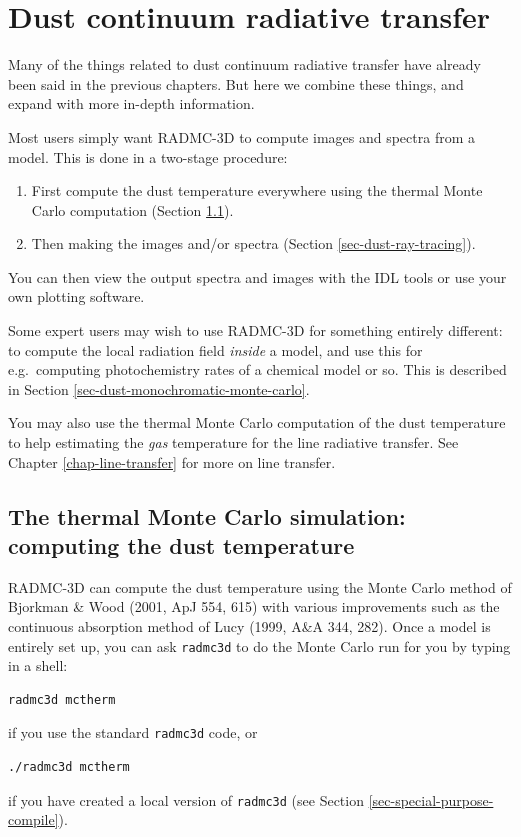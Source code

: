 \documentclass{report}
\begin{document}
\chapter{Dust continuum radiative transfer}
\label{chap-dust-transfer}
%
Many of the things related to dust continuum radiative transfer have
already been said in the previous chapters. But here we combine these
things, and expand with more in-depth information.

Most users simply want RADMC-3D to compute images and spectra from a
model. This is done in a two-stage procedure:
\begin{enumerate}
\item First compute the dust temperature everywhere using the thermal Monte
  Carlo computation (Section \ref{sec-dust-thermal-monte-carlo}).
\item Then making the images and/or spectra (Section \ref{sec-dust-ray-tracing}).
\end{enumerate}
You can then view the output spectra and images with the IDL tools or use
your own plotting software. 

Some expert users may wish to use RADMC-3D for something entirely different:
to compute the local radiation field {\em inside} a model, and use this
for e.g.\ computing photochemistry rates of a chemical model or so. 
This is described in Section \ref{sec-dust-monochromatic-monte-carlo}.

You may also use the thermal Monte Carlo computation of the dust temperature
to help estimating the {\em gas} temperature for the line radiative transfer.
See Chapter \ref{chap-line-transfer} for more on line transfer.



\section{The thermal Monte Carlo simulation: computing the dust temperature}
\label{sec-dust-thermal-monte-carlo}
%
RADMC-3D can compute the dust temperature using the Monte Carlo method of
Bjorkman \& Wood (2001, ApJ 554, 615) with various improvements such as the
continuous absorption method of Lucy (1999, A\&A 344, 282). Once a model is
entirely set up, you can ask {\small\tt radmc3d} to do the Monte Carlo
run for you by typing in a shell:
{\small\begin{verbatim}
radmc3d mctherm
\end{verbatim}}
if you use the standard {\small\tt radmc3d} code, or
{\small\begin{verbatim}
./radmc3d mctherm
\end{verbatim}}
if you have created a local version of {\small\tt radmc3d} 
(see Section \ref{sec-special-purpose-compile}).
\end{document}
